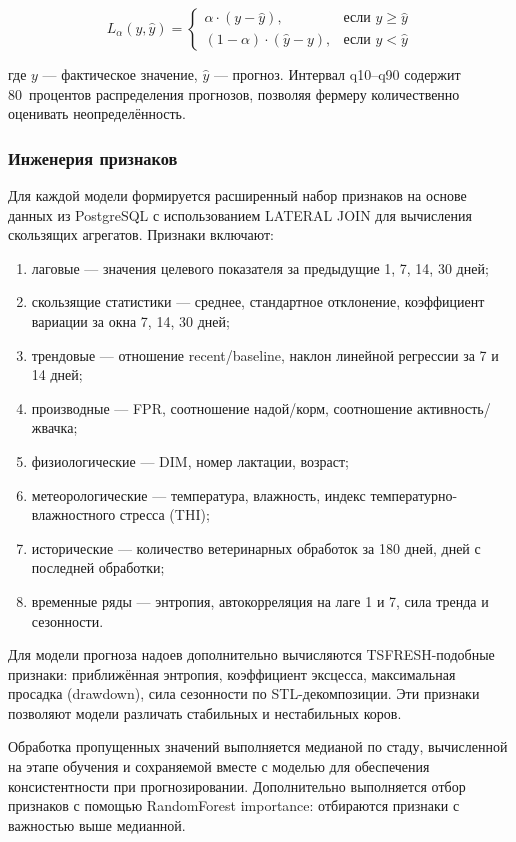 $$L_\alpha(y, \hat{y}) = \begin{cases} \alpha \cdot (y - \hat{y}), & \text{если } y \geq \hat{y} \\ (1 - \alpha) \cdot (\hat{y} - y), & \text{если } y < \hat{y} \end{cases}$$

где $y$ --- фактическое значение, $\hat{y}$ --- прогноз. Интервал q10--q90 содержит 80~процентов распределения прогнозов, позволяя фермеру количественно оценивать неопределённость.

\subsubsection{Инженерия признаков}

Для каждой модели формируется расширенный набор признаков на основе данных из PostgreSQL с использованием LATERAL JOIN для вычисления скользящих агрегатов. Признаки включают:

\begin{enumerate}
    \item лаговые --- значения целевого показателя за предыдущие 1, 7, 14, 30 дней;
    \item скользящие статистики --- среднее, стандартное отклонение, коэффициент вариации за окна 7, 14, 30 дней;
    \item трендовые --- отношение recent/baseline, наклон линейной регрессии за 7 и 14 дней;
    \item производные --- FPR, соотношение надой/корм, соотношение активность/жвачка;
    \item физиологические --- DIM, номер лактации, возраст;
    \item метеорологические --- температура, влажность, индекс температурно-влажностного стресса (THI);
    \item исторические --- количество ветеринарных обработок за 180 дней, дней с последней обработки;
    \item временные ряды --- энтропия, автокорреляция на лаге 1 и 7, сила тренда и сезонности.
\end{enumerate}

Для модели прогноза надоев дополнительно вычисляются TSFRESH-подобные признаки: приближённая энтропия, коэффициент эксцесса, максимальная просадка (drawdown), сила сезонности по STL-декомпозиции. Эти признаки позволяют модели различать стабильных и нестабильных коров.

Обработка пропущенных значений выполняется медианой по стаду, вычисленной на этапе обучения и сохраняемой вместе с моделью для обеспечения консистентности при прогнозировании. Дополнительно выполняется отбор признаков с помощью RandomForest importance: отбираются признаки с важностью выше медианной.

